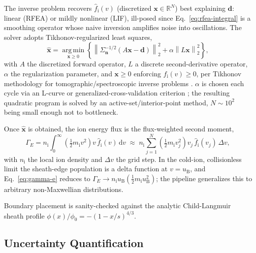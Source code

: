The inverse problem recovers $\hat f_{\mathrm{i}}(v)$ (discretized $\mathbf{x} \in \mathbb{R}^{N}$) best explaining $\mathbf{d}$: linear (RFEA) or mildly nonlinear (LIF), ill-posed since Eq.~\eqref{eq:rfea-integral} is a smoothing operator whose naive inversion amplifies noise into oscillations. The solver adopts Tikhonov-regularized least squares,
\begin{equation}
\hat{\mathbf{x}} = \operatorname*{arg\,min}_{\mathbf{x} \ge 0} \left\{ \left\| \Sigma_{\mathbf{n}}^{-1/2}\left(A\mathbf{x} - \mathbf{d}\right) \right\|_2^2 + \alpha \left\| L \mathbf{x} \right\|_2^2 \right\},
\label{ch19-eq:tikhonov}
\end{equation}
with $A$ the discretized forward operator, $L$ a discrete second-derivative operator, $\alpha$ the regularization parameter, and $\mathbf{x} \ge 0$ enforcing $f_{\mathrm{i}}(v) \ge 0$, per Tikhonov methodology for tomographic/spectroscopic inverse problems \cite{ref0677,ref0692}. $\alpha$ is chosen each cycle via an L-curve or generalized-cross-validation criterion \cite{ref0695}; the resulting quadratic program is solved by an active-set/interior-point method, $N \sim 10^2$ being small enough not to bottleneck.

Once $\hat{\mathbf{x}}$ is obtained, the ion energy flux is the flux-weighted second moment,
\begin{equation}
\Gamma_{E} = n_{\mathrm{i}} \int_{0}^{\infty} \left(\tfrac{1}{2} m_{\mathrm{i}} v^2\right) v\, \hat f_{\mathrm{i}}(v)\, \mathrm{d}v
\;\approx\; n_{\mathrm{i}} \sum_{j=1}^{N} \left(\tfrac{1}{2} m_{\mathrm{i}} v_j^2\right) v_j\, \hat f_{\mathrm{i}}(v_j)\, \Delta v ,
\label{eq:gamma-e}
\end{equation}
with $n_{\mathrm{i}}$ the local ion density and $\Delta v$ the grid step. In the cold-ion, collisionless limit the sheath-edge population is a delta function at $v = u_{\mathrm{B}}$, and Eq.~\eqref{eq:gamma-e} reduces to $\Gamma_{E} \to n_{\mathrm{i}} u_{\mathrm{B}} \left(\tfrac{1}{2} m_{\mathrm{i}} u_{\mathrm{B}}^2\right)$; the pipeline generalizes this to arbitrary non-Maxwellian distributions.

Boundary placement is sanity-checked against the analytic Child-Langmuir sheath profile $\phi(x)/\phi_0 = -(1-x/s)^{4/3}$.

\subsection{Uncertainty Quantification}
\label{sec:uq}

